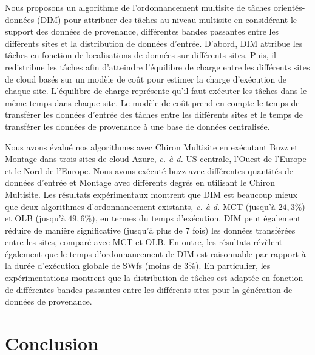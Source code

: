 Nous proposons un algorithme de l'ordonnancement multisite de tâches orientés-données (DIM) pour attribuer des tâches au niveau multisite en considérant le support des données de provenance, différentes bandes passantes entre les différents sites et la distribution de données d'entrée. D'abord, DIM attribue les tâches en fonction de localisations de données sur différents sites. Puis, il redistribue les tâches afin d'atteindre l'équilibre de charge entre les différents sites de cloud basés sur un modèle de coût pour estimer la charge d'exécution de chaque site. L'équilibre de charge représente qu'il faut exécuter les tâches dans le même temps dans chaque site. Le modèle de coût prend en compte le temps de transférer les données d'entrée des tâches entre les différents sites et le temps de transférer les données de provenance à une base de données centralisée.

Nous avons évalué nos algorithmes avec Chiron Multisite en exécutant Buzz et Montage \cite{Montage} dans trois sites de cloud Azure, \textit{c.-à-d.} US centrale, l'Ouest de l'Europe et le Nord de l'Europe. Nous avons exécuté buzz avec différentes quantités de données d'entrée et Montage avec différents degrés en utilisant le Chiron Multisite. Les résultats expérimentaux montrent que DIM est beaucoup mieux que deux algorithmes d'ordonnancement existants, \textit{c.-à-d.} MCT (jusqu'à $24,3\%$) et OLB (jusqu'à $49,6\%$), en termes du temps d'exécution. DIM peut également réduire de manière significative (jusqu'à plus de $7$ fois) les données transférées entre les sites, comparé avec MCT et OLB. En outre, les résultats révèlent également que le temps d'ordonnancement de DIM est raisonnable par rapport à la durée d'exécution globale de SWfs (moins de  $3\%$). En particulier, les expérimentations montrent que la distribution de tâches est adaptée en fonction de différentes bandes passantes entre les différents sites pour la génération de données de provenance.

\section*{Conclusion}

